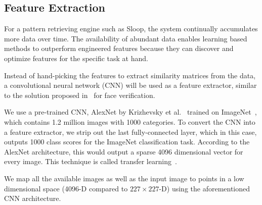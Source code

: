 \subsection{Feature Extraction} 

For a pattern retrieving engine such as Sloop, the system continually
accumulates more data over time. The availability of abundant data enables
learning based methods to outperform engineered features because they can
discover and optimize features for the specific task at hand.

Instead of hand-picking the features to extract similarity matrices from the
data, a convolutional neural network (CNN) will be used as a feature extractor,
similar to the solution proposed in~\cite{chopra05} for face verification.

We use a pre-trained CNN, AlexNet by Krizhevsky et al.~\cite{kriz12} trained on
ImageNet~\cite{imagenet}, which contains 1.2 million images with 1000
categories. To convert the CNN into a feature extractor, we strip out the last
fully-connected layer, which in this case, outputs 1000 class scores for the
ImageNet classification task. According to the AlexNet architecture, this would
output a sparse 4096 dimensional vector for every image. This technique is
called transfer learning~\cite{transfer}.

We map all the available images as well as the input image to points in a low
dimensional space (4096-D compared to $227 \times 227$-D) using the
aforementioned CNN architecture. 

